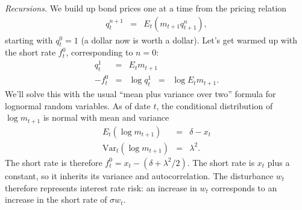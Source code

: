 \documentclass[11pt]{article}
\begin{document}
{\it Recursions.\/}
We build up bond prices one at a time from
the pricing relation
\begin{eqnarray*}
    q^{n+1}_t &=& E_t \left( m_{t+1} q^n_{t+1} \right) ,
\end{eqnarray*}
starting with $q^0_t = 1$ (a dollar now is worth a dollar).
Let's get warmed up with the short rate $f^0_t$, corresponding
to $n=0$:
\begin{eqnarray*}
    q^1_t   &=&  E_t m_{t+1} \\
    - f^0_t &=&  \log q^1_{t} \;\;=\;\; \log E_t m_{t+1} .
\end{eqnarray*}
We'll solve this with the usual ``mean plus variance over two''
formula for lognormal random variables.
As of date $t$,
the conditional distribution of $\log m_{t+1}$ is
normal with mean and variance
\begin{eqnarray*}
    E_t \left( \log m_{t+1}\right) &=& \delta - x_t \\
    \mbox{Var}_t \left( \log m_{t+1} \right) &=& \lambda^2 .
\end{eqnarray*}
The short rate is therefore
$ f^0_t = x_t - (\delta + \lambda^2/2)$.
The short rate is $x_t$ plus a constant,
so it inherits its variance and autocorrelation.
The disturbance $w_t$ therefore represents interest rate risk:
an increase in $w_t$ corresponds to an increase in the short rate
of $\sigma w_t$.
\end{document}
